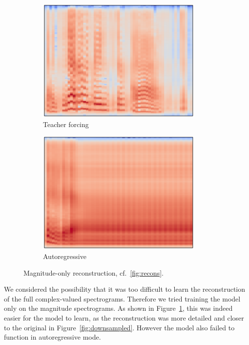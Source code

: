 \documentclass[11pt]{article}
\begin{document}
\begin{figure}
\begin{subfigure}{0.5\textwidth}
\centering
\includegraphics[width=0.9\textwidth]{image/magn_forcing.pdf}
\caption*{Teacher forcing}
\end{subfigure}%
\begin{subfigure}{0.5\textwidth}
\centering
\includegraphics[width=0.9\textwidth]{image/magn_autoreg.pdf}
\caption*{Autoregressive}
\end{subfigure}
\caption{\label{fig:recons-magn}Magnitude-only reconstruction, cf.~\ref{fig:recons}.}
\end{figure}

We considered the possibility that it was too difficult to learn
the reconstruction of the full complex-valued spectrograms.
Therefore we tried training the model only on the magnitude spectrograms.
As shown in Figure~\ref{fig:recons-magn},
this was indeed easier for the model to learn,
as the reconstruction was more detailed and closer to the original in Figure~\ref{fig:downsampled}.
However the model also failed to function in autoregressive mode.
\end{document}
